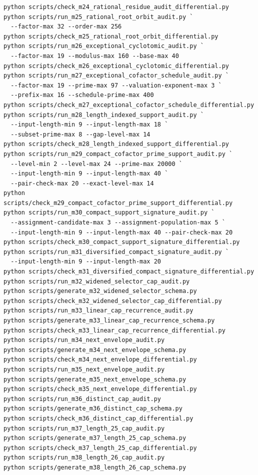 \documentclass[11pt]{article}
\begin{document}
\begin{verbatim}
python scripts/check_m24_rational_residue_audit_differential.py
python scripts/run_m25_rational_root_orbit_audit.py `
  --factor-max 32 --order-max 256
python scripts/check_m25_rational_root_orbit_differential.py
python scripts/run_m26_exceptional_cyclotomic_audit.py `
  --factor-max 19 --modulus-max 160 --base-max 40
python scripts/check_m26_exceptional_cyclotomic_differential.py
python scripts/run_m27_exceptional_cofactor_schedule_audit.py `
  --factor-max 19 --prime-max 97 --valuation-exponent-max 3 `
  --prefix-max 16 --schedule-prime-max 400
python scripts/check_m27_exceptional_cofactor_schedule_differential.py
python scripts/run_m28_length_indexed_support_audit.py `
  --input-length-min 9 --input-length-max 18 `
  --subset-prime-max 8 --gap-level-max 14
python scripts/check_m28_length_indexed_support_differential.py
python scripts/run_m29_compact_cofactor_prime_support_audit.py `
  --level-min 2 --level-max 24 --prime-max 20000 `
  --input-length-min 9 --input-length-max 40 `
  --pair-check-max 20 --exact-level-max 14
python scripts/check_m29_compact_cofactor_prime_support_differential.py
python scripts/run_m30_compact_support_signature_audit.py `
  --assignment-candidate-max 3 --assignment-population-max 5 `
  --input-length-min 9 --input-length-max 40 --pair-check-max 20
python scripts/check_m30_compact_support_signature_differential.py
python scripts/run_m31_diversified_compact_signature_audit.py `
  --input-length-min 9 --input-length-max 20
python scripts/check_m31_diversified_compact_signature_differential.py
python scripts/run_m32_widened_selector_cap_audit.py
python scripts/generate_m32_widened_selector_schema.py
python scripts/check_m32_widened_selector_cap_differential.py
python scripts/run_m33_linear_cap_recurrence_audit.py
python scripts/generate_m33_linear_cap_recurrence_schema.py
python scripts/check_m33_linear_cap_recurrence_differential.py
python scripts/run_m34_next_envelope_audit.py
python scripts/generate_m34_next_envelope_schema.py
python scripts/check_m34_next_envelope_differential.py
python scripts/run_m35_next_envelope_audit.py
python scripts/generate_m35_next_envelope_schema.py
python scripts/check_m35_next_envelope_differential.py
python scripts/run_m36_distinct_cap_audit.py
python scripts/generate_m36_distinct_cap_schema.py
python scripts/check_m36_distinct_cap_differential.py
python scripts/run_m37_length_25_cap_audit.py
python scripts/generate_m37_length_25_cap_schema.py
python scripts/check_m37_length_25_cap_differential.py
python scripts/run_m38_length_26_cap_audit.py
python scripts/generate_m38_length_26_cap_schema.py

\end{verbatim}
\end{document}
